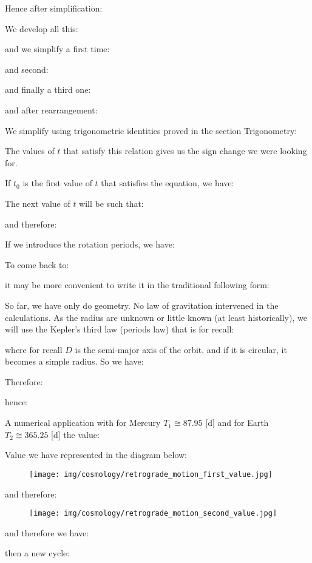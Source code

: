 	Hence after simplification:
	
	We develop all this:
	
	and we simplify a first time:
	
	and second:
	
	and finally a third one:
	
	and after rearrangement:
	
	We simplify using trigonometric identities proved in the section  Trigonometry:
	
	The values of $t$ that satisfy this relation gives us the sign change we were looking for.

	If $t_0$ is the first value of $t$ that satisfies the equation, we have:
	
	The next value of $t$ will be such that:
	
	and therefore:
	
	If we introduce the rotation periods, we have:
	
	To come back to:
	
	it may be more convenient to write it in the traditional following form:
	
	So far, we have only do geometry. No law of gravitation intervened in the calculations. As the radius are unknown or little known (at least historically), we will use the Kepler's third law (periods law) that is for recall:
	
	where for recall $D$ is the semi-major axis of the orbit, and if it is circular, it becomes a simple radius. So we have:	
	
	Therefore:
	
	hence:
	
	A numerical application with for Mercury $T_1\cong 87.95$ [d] and for Earth $T_2\cong 365.25$ [d] the value:
	
	Value we have represented in the diagram below:
	\begin{figure}[H]
		\centering
		\texttt{[image: img/cosmology/retrograde\_motion\_first\_value.jpg]}	
	\end{figure}
	and therefore:
	\begin{figure}[H]
		\centering
		\texttt{[image: img/cosmology/retrograde\_motion\_second\_value.jpg]}	
	\end{figure}
	and therefore we have:
	
	then a new cycle:
	
